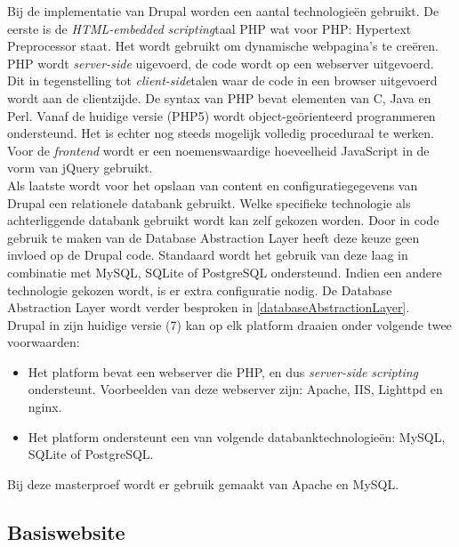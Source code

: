 Bij de implementatie van Drupal worden een aantal technologie\"{e}n gebruikt. De eerste is de \textit{HTML-embedded} \textit{scripting}taal PHP wat voor PHP: Hypertext Preprocessor staat. Het wordt gebruikt om dynamische webpagina's te cre\"{e}ren. PHP wordt \textit{server-side} uigevoerd, de code wordt op een webserver uitgevoerd. Dit in tegenstelling tot \textit{client-side}talen waar de code in een browser uitgevoerd wordt aan de clientzijde. De syntax van PHP bevat elementen van C, Java en Perl. Vanaf de huidige versie (PHP5) wordt object-ge\"{o}rienteerd programmeren ondersteund. Het is echter nog steeds mogelijk volledig proceduraal te werken.\\

Voor de \textit{frontend} wordt er een noemenswaardige hoeveelheid JavaScript in de vorm van jQuery gebruikt.\\

Als laatste wordt voor het opslaan van content en configuratiegegevens van Drupal een relationele databank gebruikt. Welke specifieke technologie als achterliggende databank gebruikt wordt kan zelf gekozen worden. Door in code gebruik te maken van de Database Abstraction Layer heeft deze keuze geen invloed op de Drupal code. Standaard wordt het gebruik van deze laag in combinatie met MySQL, SQLite of PostgreSQL ondersteund. Indien een andere technologie gekozen wordt, is er extra configuratie nodig. De Database Abstraction Layer wordt verder besproken in \ref{databaseAbstractionLayer}.\\

\noindent
Drupal in zijn huidige versie (7) kan op elk platform draaien onder volgende twee voorwaarden:
\begin{itemize}
\item Het platform bevat een webserver die PHP, en dus \textit{server-side} \textit{scripting} ondersteunt. Voorbeelden van deze webserver zijn:  Apache, IIS, Lighttpd en nginx.
\item Het platform ondersteunt een van volgende databanktechnologie\"{e}n: MySQL, SQLite of PostgreSQL.
\end{itemize}
Bij deze masterproef wordt er gebruik gemaakt van Apache en MySQL.

\subsection{Basiswebsite}

